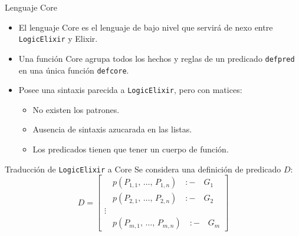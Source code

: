 \documentclass[14pt,aspectratio=169]{beamer}
\begin{document}
\begin{frame}{Lenguaje Core}
  \begin{itemize}
    \item El lenguaje Core es el lenguaje de bajo nivel que servirá de nexo
    entre \texttt{LogicElixir} y Elixir.
    \item Una función Core agrupa todos los hechos y reglas de un predicado
    \texttt{defpred} en una única función \texttt{defcore}.
    \item Posee una sintaxis parecida a \texttt{LogicElixir}, pero con matices:
    \begin{itemize}
      \item No existen los patrones.
      \item Ausencia de sintaxis azucarada en las listas.
      \item Los predicados tienen que tener un cuerpo de función.
    \end{itemize}
  \end{itemize}
\end{frame}

\begin{frame}{Traducción de \texttt{LogicElixir} a Core}
  Se considera una definición de predicado $D$:
  \begin{equation*}
    D =
    \begin{bmatrix}
      \quad p(P_{1,1},\, \ldots,\, P_{1,n}) \quad :- \quad G_1\\
      \quad p(P_{2,1},\, \ldots,\, P_{2,n}) \quad :- \quad G_2\\
      \vdots \\
      \quad p(P_{m,1},\, \ldots,\, P_{m,n}) \quad :- \quad G_m
    \end{bmatrix}
  \end{equation*}
\end{frame}
\end{document}
